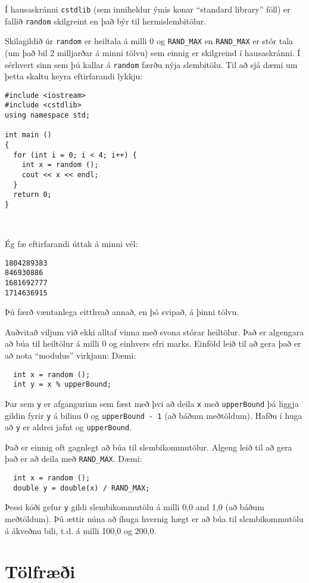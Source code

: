 Í hausaskránni {\tt cstdlib} (sem inniheldur ýmis konar ``standard library'' föll) er fallið {\tt random} skilgreint en það býr til hermislembitölur.

Skilagildið úr {\tt random} er heiltala á milli 0 og {\tt RAND\_MAX}
en {\tt RAND\_MAX} er stór tala (um það bil 2 milljarðar á minni tölvu) sem einnig er skilgreind í hausaskránni.
Í sérhvert sinn sem þú kallar á {\tt random} færðu nýja slembitölu.
Til að sjá dæmi um þetta skaltu keyra eftirfarandi lykkju:

\begin{verbatim}
#include <iostream>
#include <cstdlib>
using namespace std;

int main ()
{
  for (int i = 0; i < 4; i++) {
    int x = random ();
    cout << x << endl;
  }
  return 0;
}

  
\end{verbatim}
%
Ég fæ eftirfarandi úttak á minni vél: 

\begin{verbatim}
1804289383
846930886
1681692777
1714636915
\end{verbatim}
%
Þú færð væntanlega eitthvað annað, en þó svipað, á þinni tölvu.

Auðvitað viljum við ekki alltaf vinna með svona stórar heiltölur.
Það er algengara að búa til heiltölur á milli 0 og einhvers efri marks.
Einföld leið til að gera það er að nota ``modulus'' virkjann:
Dæmi:

\begin{verbatim}
  int x = random ();
  int y = x % upperBound;
\end{verbatim}
%
Þar sem {\tt y} er afgangurinn sem fæst með þvi að deila {\tt x} með {\tt upperBound} þá liggja gildin fyrir {\tt y} á bilinu 0 og {\tt upperBound - 1} (að báðum meðtöldum).
Hafðu í huga að {\tt y} er aldrei jafnt og {\tt upperBound}.

Það er einnig oft gagnlegt að búa til slembikommutölur.
Algeng leið til að gera það er að deila með {\tt RAND\_MAX}.
Dæmi:

\begin{verbatim}
  int x = random ();
  double y = double(x) / RAND_MAX;
\end{verbatim}
%
Þessi kóði gefur {\tt y} gildi slembikommutölu á milli 0,0 and 1,0 (að báðum meðtöldum).
Þú ættir núna að íhuga hvernig hægt er að búa til slembikommutölu á ákveðnu bili, t.d. á milli 100,0 og 200,0.

\section{Tölfræði}


